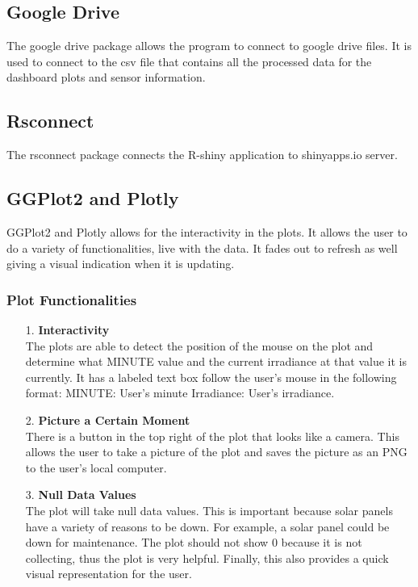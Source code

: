 \documentclass{sigchi}
\begin{document}
\subsection{Google Drive}
The google drive package allows the program to connect to google drive files. It is used to connect to the csv file that contains all the processed data for the dashboard plots and sensor information.\cite{1_GD}

\subsection{Rsconnect}
The rsconnect package connects the R-shiny application to shinyapps.io server. \cite{7_RSConnect}

\subsection{GGPlot2 and Plotly}
GGPlot2 and Plotly allows for the interactivity in the plots. It allows the user to do a variety of functionalities, live with the data. It fades out to refresh as well giving a visual indication when it is updating.

\subsubsection{Plot Functionalities}
\begin{itemize}
    \item[1.] \textbf{Interactivity}\\
    The plots are able to detect the position of the mouse on the plot and determine what MINUTE value and the current irradiance at that value it is currently. It has a labeled text box follow the user's mouse in the following format: MINUTE: {User's minute} Irradiance: {User's irradiance}.
    \item[2.] \textbf{Picture a Certain Moment}\\
    There is a button in the top right of the plot that looks like a camera. This allows the user to take a picture of the plot and saves the picture as an PNG to the user's local computer.
    \item[3.] \textbf{Null Data Values}\\
    The plot will take null data values. This is important because solar panels have a variety of reasons to be down. For example, a solar panel could be down for maintenance. The plot should not show 0 because it is not collecting, thus the plot is very helpful. Finally, this also provides a quick visual representation for the user.
\end{itemize}
\end{document}
